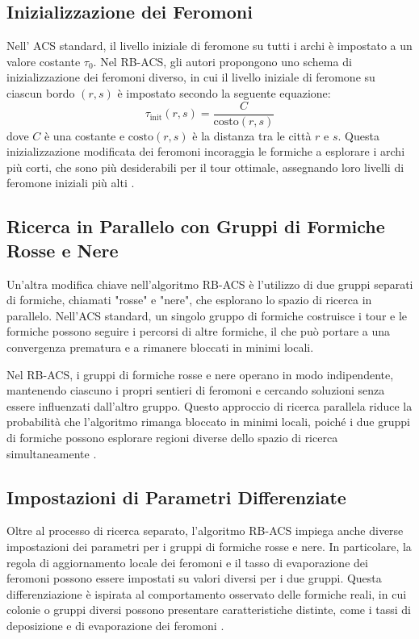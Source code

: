 \subsection{Inizializzazione dei Feromoni}
Nell' \gls{ACS} standard, il livello iniziale di feromone su tutti i archi è impostato a un valore costante $\tau_0$. Nel \gls{RB-ACS}, gli autori propongono uno schema di inizializzazione dei feromoni diverso, in cui il livello iniziale di feromone su ciascun bordo $(r,s)$ è impostato secondo la seguente equazione:
\begin{equation}
	\tau_\text{init}(r,s) = \frac{C}{\text{costo}(r,s)}
\end{equation}
dove $C$ è una costante e $\text{costo}(r,s)$ è la distanza tra le città $r$ e $s$. Questa inizializzazione modificata dei feromoni incoraggia le formiche a esplorare i archi più corti, che sono più desiderabili per il tour ottimale, assegnando loro livelli di feromone iniziali più alti \cite{Hassan2013}.

\subsection{Ricerca in Parallelo con Gruppi di Formiche Rosse e Nere}
Un'altra modifica chiave nell'algoritmo \gls{RB-ACS} è l'utilizzo di due gruppi separati di formiche, chiamati "rosse" e "nere", che esplorano lo spazio di ricerca in parallelo. Nell'\gls{ACS} standard, un singolo gruppo di formiche costruisce i tour e le formiche possono seguire i percorsi di altre formiche, il che può portare a una convergenza prematura e a rimanere bloccati in minimi locali.

Nel \gls{RB-ACS}, i gruppi di formiche rosse e nere operano in modo indipendente, mantenendo ciascuno i propri sentieri di feromoni e cercando soluzioni senza essere influenzati dall'altro gruppo. Questo approccio di ricerca parallela riduce la probabilità che l'algoritmo rimanga bloccato in minimi locali, poiché i due gruppi di formiche possono esplorare regioni diverse dello spazio di ricerca simultaneamente \cite{Hassan2013}.

\subsection{Impostazioni di Parametri Differenziate}
Oltre al processo di ricerca separato, l'algoritmo \gls{RB-ACS} impiega anche diverse impostazioni dei parametri per i gruppi di formiche rosse e nere. In particolare, la regola di aggiornamento locale dei feromoni e il tasso di evaporazione dei feromoni possono essere impostati su valori diversi per i due gruppi. Questa differenziazione è ispirata al comportamento osservato delle formiche reali, in cui colonie o gruppi diversi possono presentare caratteristiche distinte, come i tassi di deposizione e di evaporazione dei feromoni \cite{Hassan2013}.

